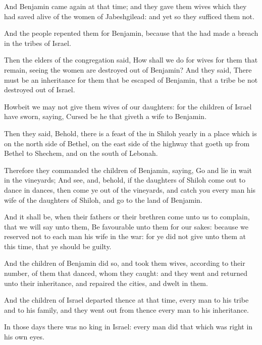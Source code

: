 \Verse And Benjamin came again at that time; and they gave them wives which they had saved alive of the women of Jabeshgilead: and yet so they sufficed them not.

\Verse And the people repented them for Benjamin, because that the \LORD had made a breach in the tribes of Israel.

\Verse Then the elders of the congregation said, How shall we do for wives for them that remain, seeing the women are destroyed out of Benjamin?  \Verse And they said, There must be an inheritance for them that be escaped of Benjamin, that a tribe be not destroyed out of Israel.

\Verse Howbeit we may not give them wives of our daughters: for the children of Israel have sworn, saying, Cursed be he that giveth a wife to Benjamin.

\Verse Then they said, Behold, there is a feast of the \LORD in Shiloh yearly in a place which is on the north side of Bethel, on the east side of the highway that goeth up from Bethel to Shechem, and on the south of Lebonah.

\Verse Therefore they commanded the children of Benjamin, saying, Go and lie in wait in the vineyards; \Verse And see, and, behold, if the daughters of Shiloh come out to dance in dances, then come ye out of the vineyards, and catch you every man his wife of the daughters of Shiloh, and go to the land of Benjamin.

\Verse And it shall be, when their fathers or their brethren come unto us to complain, that we will say unto them, Be favourable unto them for our sakes: because we reserved not to each man his wife in the war: for ye did not give unto them at this time, that ye should be guilty.

\Verse And the children of Benjamin did so, and took them wives, according to their number, of them that danced, whom they caught: and they went and returned unto their inheritance, and repaired the cities, and dwelt in them.

\Verse And the children of Israel departed thence at that time, every man to his tribe and to his family, and they went out from thence every man to his inheritance.

\Verse In those days there was no king in Israel: every man did that which was right in his own eyes.

